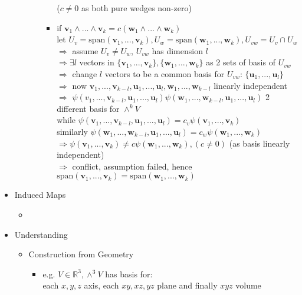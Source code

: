 \begin{itemize}
\begin{itemize}
\begin{itemize}
\begin{itemize}
			($c\neq0$ as both pure wedges non-zero)
			\item if $\mathbf v_1\wedge...\wedge \mathbf v_k = c(\mathbf w_1\wedge...\wedge \mathbf w_k)$ \\ 
			let $U_v = \text{span}(\mathbf v_1,...,\mathbf v_k), U_w = \text{span}(\mathbf w_1,...,\mathbf w_k), U_{vw} = U_v\cap U_w$ \\
			$\Rightarrow$ assume $U_v \neq U_w$, $U_{vw}$ has dimension $l$\\
			$\Rightarrow \exists l$ vectors in $\{\mathbf v_1,...,\mathbf v_k\}, \{ \mathbf w_1,...,\mathbf w_k\}$ as 2 sets of basis of $U_{vw}$ \\
			$\Rightarrow$ change $l$ vectors to be a common basis for $U_{vw}$: $\{ \mathbf u_1,...,\mathbf u_l \}$ \\
			$\Rightarrow$ now $\mathbf v_1,...,\mathbf v_{k-l}, \mathbf u_1,...,\mathbf u_l, \mathbf w_1,...,\mathbf w_{k-l}$  linearly independent \\
			$\Rightarrow$ $\psi(v_1,...,\mathbf v_{k-l}, \mathbf u_1,...,\mathbf u_l) \psi(\mathbf w_1,...,\mathbf w_{k-l}, \mathbf u_1,...,\mathbf u_l)$ 2 different basis for $\wedge^kV$ \\
			while $\psi(\mathbf v_1,...,\mathbf v_{k-l}, \mathbf u_1,...,\mathbf u_l) = c_v\psi(\mathbf v_1,...,\mathbf v_{k})$ \\ 
			similarly $\psi(\mathbf w_1,...,\mathbf w_{k-l}, \mathbf u_1,...,\mathbf u_l) = c_w\psi(\mathbf w_1,...,\mathbf w_{k})$ \\
			$\Rightarrow \psi(\mathbf v_1,...,\mathbf v_{k}) \neq c \psi(\mathbf w_1,...,\mathbf w_{k}), (c\neq0)$ (as basis linearly independent) \\
			$\Rightarrow$ conflict, assumption failed, hence $\text{span}(\mathbf v_1,...,\mathbf v_k) = \text{span}(\mathbf w_1,...,\mathbf w_k)$
			\end{itemize}
		\end{itemize}
	\end{itemize}
\item Induced Maps
	\begin{itemize}
	\item 
	\end{itemize}
\item Understanding
	\begin{itemize}
	\item Construction from Geometry
		\begin{itemize}
		\item e.g. $V\in\mathbb R^3, \wedge^3 V$ has basis for: \\ 
		each $x,y,z$ axis, each $xy, xz, yz$ plane and finally $xyz$ volume
		\end{itemize}
	\end{itemize}
\end{itemize}

